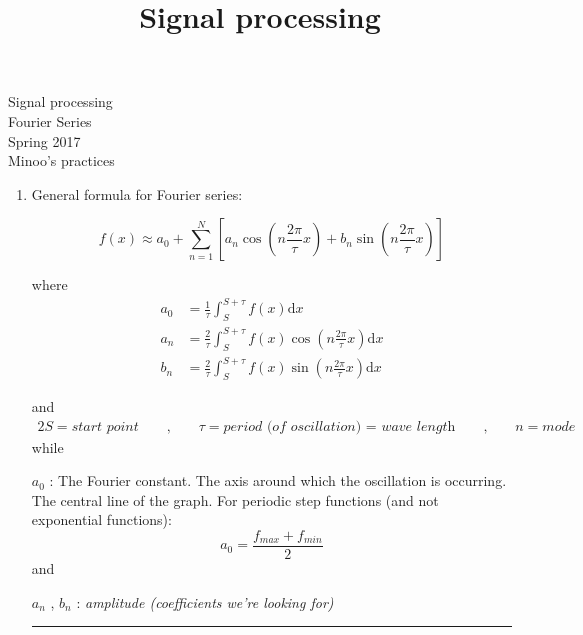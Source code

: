 \documentclass{amsart}
\title {Signal processing}
\theoremstyle{definition}
\newcommand{\dx}{\text{d}x}
\begin{document}
\begin{center}
	{\bgbf Signal processing\\ \smallskip
	Fourier Series\\ \smallskip
	Spring 2017\\ \smallskip
	Minoo's practices}
\end{center}
\vspace{1.25cm}

\begin{enumerate}
    \item General formula for Fourier series:
           
           \begin{equation*}
f(x) \approx a_0 + \sum_{n=1}^{N} [a_n \cos (n \frac {2 \pi} {\tau} x) + b_n \sin (n \frac {2 \pi} {\tau} x)]
\end{equation*}
            
            where
            \begin{align*}
            a_0 &= \frac {1}{\tau} \int_{S}^{S+\tau} f(x) \dx \\
            a_n &= \frac {2}{\tau} \int_{S}^{S+\tau} f(x) \cos (n \frac {2 \pi}{\tau} x) \dx \\  
           b_n &= \frac {2}{\tau} \int_{S}^{S+\tau} f(x) \sin (n \frac {2 \pi}{\tau} x) \dx
           \end{align*}
           
            and
            \begin{alignat*}{2}
            S = \textit{start point} \qquad\text{,}\qquad \tau = \textit{period (of oscillation) = wave length} \qquad\text{,}\qquad n = \textit{mode} 
        \end{alignat*}
            while\\
            \smallskip
            
        	$a_0$ : The Fourier constant. The axis around which the oscillation is occurring. The central line of the graph.
        For periodic step functions (and not exponential functions): \[a_0 = \frac {f_{max} +f_{min}}{2}\]
and\\
\smallskip

$a_n$ , $b_n$ : \textit{amplitude (coefficients we're looking for)}
        
\vspace{.5cm} %
\hrule %
\vspace{.5cm} %
        

\end{enumerate}
\end{document}
